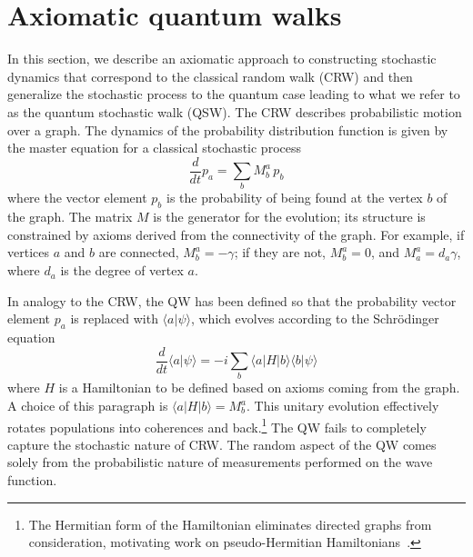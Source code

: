 \documentclass[11pt,oneside,final]{huthesis}%
\begin{document}
\section{Axiomatic quantum walks}

In this section, we describe an axiomatic approach to constructing stochastic dynamics that correspond to the classical random walk (CRW) and then generalize the stochastic process to the quantum case leading to what we refer to as the quantum stochastic walk (QSW). The CRW describes probabilistic motion over a graph. The dynamics of the probability distribution function is given by the master equation for a classical stochastic process
\begin{equation}
\label{cw}
\frac{d}{dt} p_a=\sum_b M_{b}^a\, p_b
\end{equation}
where the vector element $p_b$ is the probability of being found at the vertex $b$ of the graph.  The matrix $M$ is the generator for the evolution; its structure is constrained by axioms derived from the connectivity of the graph. For example, if vertices $a$ and $b$ are connected, $M_{b}^a =-\gamma$; if they are not, $M_{b}^a =0$, and $M_a^a=d_a\gamma$, where $d_a$ is the degree of vertex $a$.

In analogy to the CRW, the QW \cite{Farhi98} has been defined so
that the probability vector element $p_a$ is replaced with $\langle a
\vert \psi \rangle$, which evolves according to the Schr\"odinger equation
\begin{equation}
\label{qw}
\frac{d}{dt} \langle  a \vert \psi \rangle=-i\sum_b  \langle a \vert H \vert b \rangle \langle b \vert \psi \rangle
\end{equation}
where $H$ is a Hamiltonian to be defined based on axioms coming from
the graph.  A choice of this paragraph is $\langle a \vert H
\vert b \rangle = M_{b}^a$. This unitary evolution effectively rotates
populations into coherences and back.\footnote{The Hermitian form of
  the Hamiltonian eliminates directed graphs from consideration,
  motivating work on pseudo-Hermitian Hamiltonians~\cite{Salimi09}.}
The QW fails to completely capture
the stochastic nature of CRW.  The random aspect of the QW comes
solely from the probabilistic nature of measurements performed on the
wave function.
\end{document}
